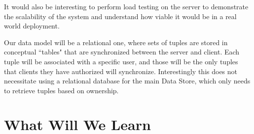 \documentclass[12pt]{article}
\begin{document}
    It would also be interesting to perform load testing on the server to demonstrate the scalability of the system and understand how viable it would be in a real world deployment.


    Our data model will be a relational one, where sets of tuples are stored in conceptual ``tables" that are synchronized between the server and client.
    Each tuple will be associated with a specific user, and those will be the only tuples that clients they have authorized will synchronize.
    Interestingly this does not necessitate using a relational database for the main Data Store, which only needs to retrieve tuples based on ownership.


    \section{What Will We Learn}

\end{document}
